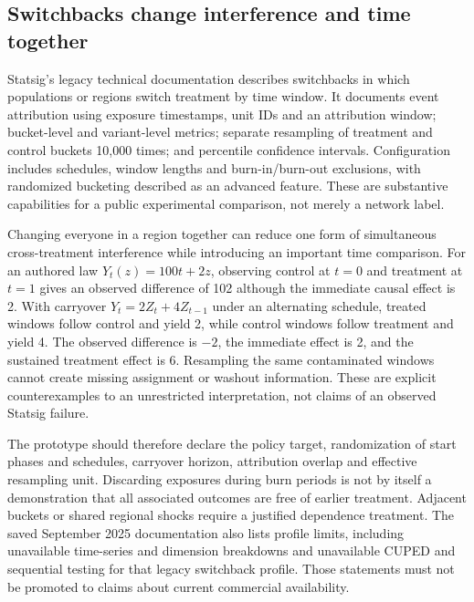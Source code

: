 \subsection{Switchbacks change interference and time together}
\label{exec20:network-switchback}

Statsig's legacy technical documentation describes switchbacks in which
populations or regions switch treatment by time window. It documents event
attribution using exposure timestamps, unit IDs and an attribution window;
bucket-level and variant-level metrics; separate resampling of treatment and
control buckets 10,000 times; and percentile confidence intervals. Configuration
includes schedules, window lengths and burn-in/burn-out exclusions, with
randomized bucketing described as an advanced feature. These are substantive
capabilities for a public experimental comparison, not merely a network label.
\citep{exec20_network_statsig_types,exec20_network_statsig_switchback}

Changing everyone in a region together can reduce one form of simultaneous
cross-treatment interference while introducing an important time comparison.
For an authored law $Y_t(z)=100t+2z$, observing control at $t=0$ and treatment at
$t=1$ gives an observed difference of 102 although the immediate causal effect
is 2. With carryover $Y_t=2Z_t+4Z_{t-1}$ under an alternating schedule, treated
windows follow control and yield 2, while control windows follow treatment and
yield 4. The observed difference is $-2$, the immediate effect is 2, and the
sustained treatment effect is 6. Resampling the same contaminated windows cannot
create missing assignment or washout information. These are explicit
counterexamples to an unrestricted interpretation, not claims of an observed
Statsig failure. \citep{exec20_network_reference}

The prototype should therefore declare the policy target, randomization of
start phases and schedules, carryover horizon, attribution overlap and effective
resampling unit. Discarding exposures during burn periods is not by itself a
demonstration that all associated outcomes are free of earlier treatment.
Adjacent buckets or shared regional shocks require a justified dependence
treatment. The saved September 2025 documentation also lists profile limits,
including unavailable time-series and dimension breakdowns and unavailable CUPED
and sequential testing for that legacy switchback profile. Those statements
must not be promoted to claims about current commercial availability.
\citep{exec20_network_statsig_switchback}


